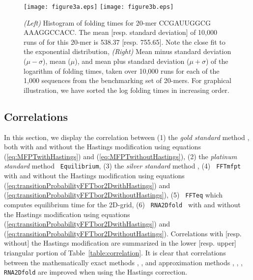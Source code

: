 \begin{figure*}
\centering
\texttt{[image: figure3a.eps]}
\texttt{[image: figure3b.eps]}
\caption{{\em (Left)} Histogram of \kinfold folding times for 20-mer CCGAUUGGCG AAAGGCCACC. The mean [resp. standard deviation] of 10,000 runs of \kinfold for this 20-mer is 538.37 [resp. 755.65]. Note the close fit to the exponential distribution, {\em (Right)} Mean minus standard deviation ($\mu -\sigma$), mean ($\mu$), and mean plus standard deviation ($\mu + \sigma$) of the logarithm of \kinfold folding times, taken over 10,000 runs for each of the 1,000 sequences from the benchmarking set of 20-mers. For graphical illustration, we have sorted the log folding times in increasing order. } \label{fig:meanStdevKinfoldRuns1000sequences}
\end{figure*}



\subsection{Correlations}

In this section, we display the correlation between (1) the {\em gold
standard} method \rnamfpt, both with and without the Hastings
modification using equations (\ref{eq:MFPTwithHastings}) and
(\ref{eq:MFPTwithoutHastings}), (2) the {\em platinum standard} method {\tt
Equilibrium}, (3) the {\em silver standard} method \kinfold, (4) {\tt
FFTmfpt} with and without the Hastings modification using equations
(\ref{eq:transitionProbabilityFFTbor2DwithHastings}) and
(\ref{eq:transitionProbabilityFFTbor2DwithoutHastings}), (5) {\tt
FFTeq} which computes equilibrium time for the 2D-grid, (6) {\tt
RNA2Dfold } with and without the Hastings modification using equations
(\ref{eq:transitionProbabilityFFTbor2DwithHastings}) and
(\ref{eq:transitionProbabilityFFTbor2DwithoutHastings}). Correlations
with [resp. without] the Hastings modification are summarized in the
lower [resp. upper] triangular portion of
Table~\ref{table:correlation}. It is clear that correlations between
the mathematically exact methods \rnamfpt, \rnaeq, and
approximation methods \kinfold, \fftmfpt, \ffteq, {\tt
RNA2Dfold} are improved when using the Hastings correction.

